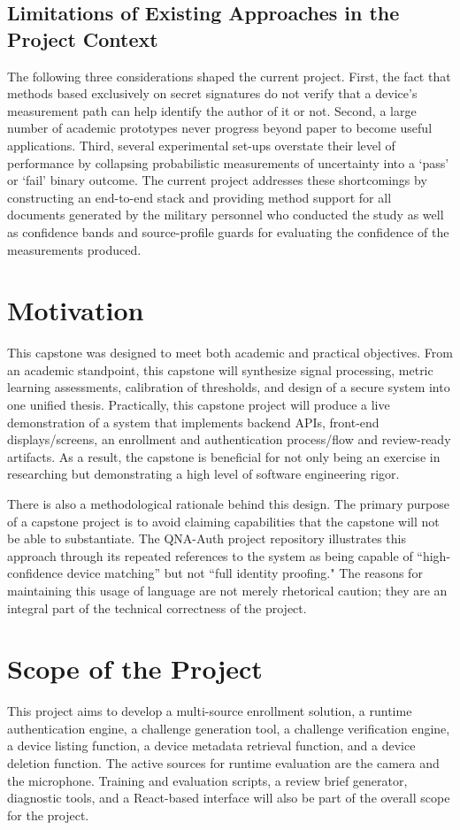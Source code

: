 \subsection{Limitations of Existing Approaches in the Project Context}
The following three considerations shaped the current project. First, the fact that methods based exclusively on secret signatures do not verify that a device's measurement path can help identify the author of it or not. Second, a large number of academic prototypes never progress beyond paper to become useful applications. Third, several experimental set-ups overstate their level of performance by collapsing probabilistic measurements of uncertainty into a ‘pass’ or ‘fail’ binary outcome. The current project addresses these shortcomings by constructing an end-to-end stack and providing method support for all documents generated by the military personnel who conducted the study as well as confidence bands and source-profile guards for evaluating the confidence of the measurements produced.

\section{Motivation}
This capstone was designed to meet both academic and practical objectives. From an academic standpoint, this capstone will synthesize signal processing, metric learning assessments, calibration of thresholds, and design of a secure system into one unified thesis. Practically, this capstone project will produce a live demonstration of a system that implements backend APIs, front-end displays/screens, an enrollment and authentication process/flow and review-ready artifacts. As a result, the capstone is beneficial for not only being an exercise in researching but demonstrating a high level of software engineering rigor.

There is also a methodological rationale behind this design. The primary purpose of a capstone project is to avoid claiming capabilities that the capstone will not be able to substantiate. The QNA-Auth project repository illustrates this approach through its repeated references to the system as being capable of “high-confidence device matching” but not “full identity proofing." The reasons for maintaining this usage of language are not merely rhetorical caution; they are an integral part of the technical correctness of the project.

\section{Scope of the Project}
This project aims to develop a multi-source enrollment solution, a runtime authentication engine, a challenge generation tool, a challenge verification engine, a device listing function, a device metadata retrieval function, and a device deletion function. The active sources for runtime evaluation are the camera and the microphone. Training and evaluation scripts, a review brief generator, diagnostic tools, and a React-based interface will also be part of the overall scope for the project.

